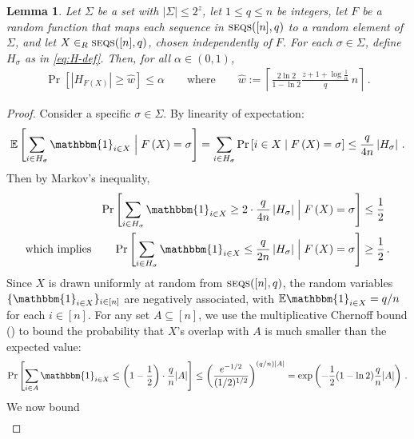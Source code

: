 \documentclass[10pt,a4paper]{article}
\newtheorem{lemma}[theorem]{Lemma}
\theoremstyle{definition}
\theoremstyle{remark}
\newcommand{\EE}{\mathbb{E}}
\newcommand{\indic}{\mathbbm{1}}
\newcommand{\SSD}[2]{\textsc{seqs}(#1,#2)}  %
\begin{document}
\begin{itemize}
\begin{itemize}
\begin{lemma}\label{lem:forward-avoid}
  Let $\Sigma$ be a set with $|\Sigma| \le 2^z$, let $1 \le q \le n$ be
  integers, let $F$ be a random function that maps each sequence in
  $\SSD{[n]}{q}$ to a random element of $\Sigma$, and let $X \in_R
  \SSD{[n]}{q}$, chosen independently of $F$. For each $\sigma\in\Sigma$,
  define $H_\sigma$ as in \cref{eq:H-def}. Then, for all
  $\alpha\in\left(0,1\right)$,
  \begin{align*}
    \Pr\left[\left|H_{F(X)}\right|\ge\hat{w}\right] \le \alpha
    \qquad\text{where}\qquad
    \hat{w} := \left\lceil \frac{2\ln2}{1-\ln2} \frac{z+1+\log\frac{1}{\alpha}}{q}\, n\right\rceil \,.
  \end{align*}
\end{lemma}
%
\begin{proof}%
   Consider a specific $\sigma\in\Sigma$. By linearity of expectation:
  \begin{align*}
    \EE\left[\sum_{i\in H_{\sigma}}\indic_{i \in X}\Bigm| F\left(X\right)=\sigma\right]=\sum_{i\in H_{\sigma}}\Pr\left[i\in X\mid F\left(X\right)=\sigma\right]\le\frac{q}{4n}\left|H_{\sigma}\right| \,.
  \end{align*}
  Then by Markov's inequality,
  \begin{align*}
    \Pr\left[\sum_{i\in H_{\sigma}}\indic_{i \in X}\ge2\cdot\frac{q}{4n}\left|H_{\sigma}\right|\Bigm| F\left(X\right)=\sigma\right]
      &\le \frac{1}{2} \\
      \text{which implies}\qquad
      \Pr\left[\sum_{i\in H_{\sigma}}\indic_{i \in X}\le\frac{q}{2n}\left|H_{\sigma}\right|\Bigm| F\left(X\right)=\sigma\right]
        &\ge \frac{1}{2} \,.
  \end{align*}
  Since $X$ is drawn uniformly at random from $\SSD{[n]}{q}$, the random
  variables $\{\indic_{i \in X}\}_{i \in [n]}$ are negatively associated, with
  $\EE \indic_{i \in X} = q/n$ for each $i \in [n]$. For any set $A
  \subseteq [n]$, we use the multiplicative Chernoff bound
  () to bound the probability that $X$'s overlap
  with $A$ is much smaller than the expected value:
  \begin{align*}
    \Pr\left[\sum_{i\in A}\indic_{i \in X}\le\left(1-\frac{1}{2}\right)\cdot\frac{q}{n}|A|\right]
      \le\left(\frac{e^{-1/2}}{(1/2)^{1/2}}\right)^{(q/n)|A|}
      =\exp\left(-\frac{1}{2}(1-\ln 2)\frac{q}{n}|A|\right) \,.
  \end{align*}
  We now bound
  \begin{align*}

\end{align*}
\end{proof}
\end{itemize}
\end{itemize}
\end{document}
